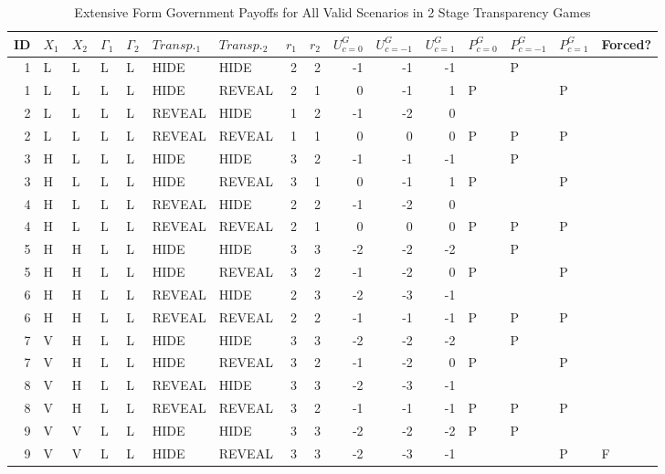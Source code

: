 \begingroup\tiny
\begin{longtable}{rllllllrrrrrllll}
\caption{Extensive Form Government Payoffs for All Valid Scenarios in 2 Stage Transparency Games} \\ 
  \hline
ID & $X_{1}$ & $X_{2}$ & $\Gamma_{1}$ & $\Gamma_{2}$ & $Transp._{1}$ & $Transp._{2}$ & $r_{1}$ & $r_{2}$ & $U^{G}_{c = 0}$ & $U^{G}_{c = -1}$ & $U^{G}_{c = 1}$ & $P^{G}_{c=0}$ & $P^{G}_{c = -1}$ & $P^{G}_{c = 1}$ & Forced? \\ 
  \hline
1 & L & L & L & L & HIDE & HIDE & 2 & 2 & -1 & -1 & -1 &  & P &  &  \\ 
  1 & L & L & L & L & HIDE & REVEAL & 2 & 1 & 0 & -1 & 1 & P &  & P &  \\ 
  2 & L & L & L & L & REVEAL & HIDE & 1 & 2 & -1 & -2 & 0 &  &  &  &  \\ 
  2 & L & L & L & L & REVEAL & REVEAL & 1 & 1 & 0 & 0 & 0 & P & P & P &  \\ 
  3 & H & L & L & L & HIDE & HIDE & 3 & 2 & -1 & -1 & -1 &  & P &  &  \\ 
  3 & H & L & L & L & HIDE & REVEAL & 3 & 1 & 0 & -1 & 1 & P &  & P &  \\ 
  4 & H & L & L & L & REVEAL & HIDE & 2 & 2 & -1 & -2 & 0 &  &  &  &  \\ 
  4 & H & L & L & L & REVEAL & REVEAL & 2 & 1 & 0 & 0 & 0 & P & P & P &  \\ 
  5 & H & H & L & L & HIDE & HIDE & 3 & 3 & -2 & -2 & -2 &  & P &  &  \\ 
  5 & H & H & L & L & HIDE & REVEAL & 3 & 2 & -1 & -2 & 0 & P &  & P &  \\ 
  6 & H & H & L & L & REVEAL & HIDE & 2 & 3 & -2 & -3 & -1 &  &  &  &  \\ 
  6 & H & H & L & L & REVEAL & REVEAL & 2 & 2 & -1 & -1 & -1 & P & P & P &  \\ 
  7 & V & H & L & L & HIDE & HIDE & 3 & 3 & -2 & -2 & -2 &  & P &  &  \\ 
  7 & V & H & L & L & HIDE & REVEAL & 3 & 2 & -1 & -2 & 0 & P &  & P &  \\ 
  8 & V & H & L & L & REVEAL & HIDE & 3 & 3 & -2 & -3 & -1 &  &  &  &  \\ 
  8 & V & H & L & L & REVEAL & REVEAL & 3 & 2 & -1 & -1 & -1 & P & P & P &  \\ 
  9 & V & V & L & L & HIDE & HIDE & 3 & 3 & -2 & -2 & -2 & P & P &  &  \\ 
  9 & V & V & L & L & HIDE & REVEAL & 3 & 3 & -2 & -3 & -1 &  &  & P & F \\ 

\end{longtable}
